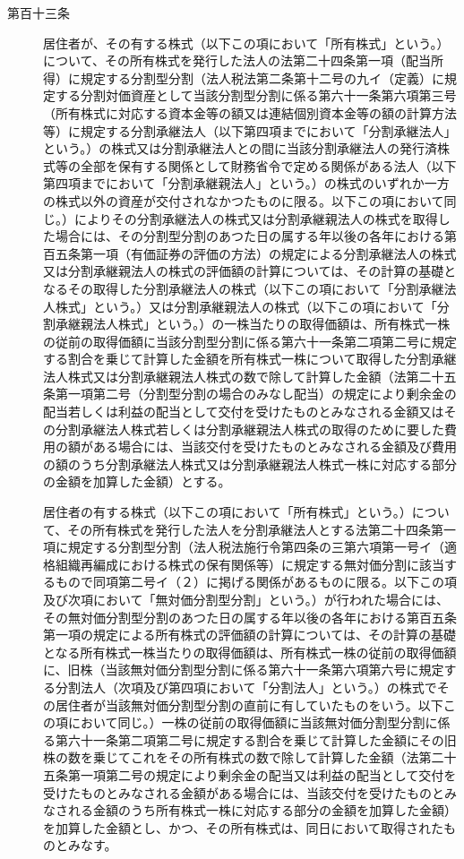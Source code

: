 \documentclass[twocolumn,a4j,10pt]{ltjtarticle}
\begin{document}
\begin{description}
\item[第百十三条]居住者が、その有する株式（以下この項において「所有株式」という。）について、その所有株式を発行した法人の法第二十四条第一項（配当所得）に規定する分割型分割（法人税法第二条第十二号の九イ（定義）に規定する分割対価資産として当該分割型分割に係る第六十一条第六項第三号（所有株式に対応する資本金等の額又は連結個別資本金等の額の計算方法等）に規定する分割承継法人（以下第四項までにおいて「分割承継法人」という。）の株式又は分割承継法人との間に当該分割承継法人の発行済株式等の全部を保有する関係として財務省令で定める関係がある法人（以下第四項までにおいて「分割承継親法人」という。）の株式のいずれか一方の株式以外の資産が交付されなかつたものに限る。以下この項において同じ。）によりその分割承継法人の株式又は分割承継親法人の株式を取得した場合には、その分割型分割のあつた日の属する年以後の各年における第百五条第一項（有価証券の評価の方法）の規定による分割承継法人の株式又は分割承継親法人の株式の評価額の計算については、その計算の基礎となるその取得した分割承継法人の株式（以下この項において「分割承継法人株式」という。）又は分割承継親法人の株式（以下この項において「分割承継親法人株式」という。）の一株当たりの取得価額は、所有株式一株の従前の取得価額に当該分割型分割に係る第六十一条第二項第二号に規定する割合を乗じて計算した金額を所有株式一株について取得した分割承継法人株式又は分割承継親法人株式の数で除して計算した金額（法第二十五条第一項第二号（分割型分割の場合のみなし配当）の規定により剰余金の配当若しくは利益の配当として交付を受けたものとみなされる金額又はその分割承継法人株式若しくは分割承継親法人株式の取得のために要した費用の額がある場合には、当該交付を受けたものとみなされる金額及び費用の額のうち分割承継法人株式又は分割承継親法人株式一株に対応する部分の金額を加算した金額）とする。
\item[]居住者の有する株式（以下この項において「所有株式」という。）について、その所有株式を発行した法人を分割承継法人とする法第二十四条第一項に規定する分割型分割（法人税法施行令第四条の三第六項第一号イ（適格組織再編成における株式の保有関係等）に規定する無対価分割に該当するもので同項第二号イ（２）に掲げる関係があるものに限る。以下この項及び次項において「無対価分割型分割」という。）が行われた場合には、その無対価分割型分割のあつた日の属する年以後の各年における第百五条第一項の規定による所有株式の評価額の計算については、その計算の基礎となる所有株式一株当たりの取得価額は、所有株式一株の従前の取得価額に、旧株（当該無対価分割型分割に係る第六十一条第六項第六号に規定する分割法人（次項及び第四項において「分割法人」という。）の株式でその居住者が当該無対価分割型分割の直前に有していたものをいう。以下この項において同じ。）一株の従前の取得価額に当該無対価分割型分割に係る第六十一条第二項第二号に規定する割合を乗じて計算した金額にその旧株の数を乗じてこれをその所有株式の数で除して計算した金額（法第二十五条第一項第二号の規定により剰余金の配当又は利益の配当として交付を受けたものとみなされる金額がある場合には、当該交付を受けたものとみなされる金額のうち所有株式一株に対応する部分の金額を加算した金額）を加算した金額とし、かつ、その所有株式は、同日において取得されたものとみなす。

\end{description}
\end{document}
